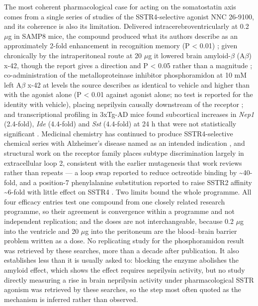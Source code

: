\documentclass[11pt]{article}
\begin{document}
The most coherent pharmacological case for acting on the somatostatin axis comes from a single series of studies of the SSTR4-selective agonist NNC 26-9100, and its coherence is also its limitation. Delivered intracerebroventricularly at 0.2 $\mu$g in SAMP8 mice, the compound produced what its authors describe as an approximately 2-fold enhancement in recognition memory (P < 0.01) \citep{Sandoval2012}; given chronically by the intraperitoneal route at 20 $\mu$g it lowered brain amyloid-$\beta$ (A$\beta$) x-42, though the report gives a direction and P < 0.05 rather than a magnitude \citep{Sandoval2011}; co-administration of the metalloproteinase inhibitor phosphoramidon at 10 mM left A$\beta$ x-42 at levels the source describes as identical to vehicle and higher than with the agonist alone (P < 0.01 against agonist alone; no test is reported for the identity with vehicle), placing neprilysin causally downstream of the receptor \citep{Sandoval2013}; and transcriptional profiling in 3xTg-AD mice found subcortical increases in \emph{Nep1} (2.4-fold), \emph{Ide} (4.4-fold) and \emph{Sst} (4.4-fold) at 24 h that were not statistically significant \citep{Sandoval2019}. Medicinal chemistry has continued to produce SSTR4-selective chemical series with Alzheimer's disease named as an intended indication \citep{AbdelMagid2024}, and structural work on the receptor family places subtype discrimination largely in extracellular loop 2, consistent with the earlier mutagenesis that work reviews rather than repeats --- a loop swap reported to reduce octreotide binding by \textasciitilde{}40-fold, and a position-7 phenylalanine substitution reported to raise SSTR2 affinity \textasciitilde{}6-fold with little effect on SSTR4 \citep{Zhao2022}. Two limits bound the whole programme. All four efficacy entries test one compound from one closely related research programme, so their agreement is convergence within a programme and not independent replication; and the doses are not interchangeable, because 0.2 $\mu$g into the ventricle and 20 $\mu$g into the peritoneum are the blood--brain barrier problem written as a dose. No replicating study for the phosphoramidon result was retrieved by these searches, more than a decade after publication. It also establishes less than it is usually asked to: blocking the enzyme abolishes the amyloid effect, which shows the effect requires neprilysin activity, but no study directly measuring a rise in brain neprilysin activity under pharmacological SSTR agonism was retrieved by these searches, so the step most often quoted as the mechanism is inferred rather than observed.
\end{document}
